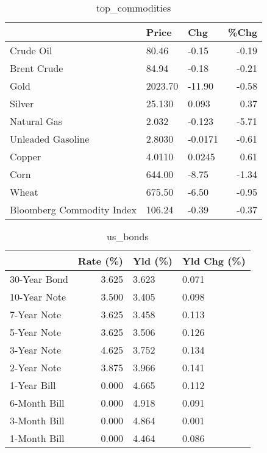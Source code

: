 \documentclass{article}%
\begin{document}
\begin{table}[htbp]%
\caption{top\_commodities}%
\centering%
\begin{adjustbox}{width=1\textwidth}%
\begin{tabular}{lllr}
\toprule
                          &   Price &     Chg &  \%Chg \\
\midrule
               Crude Oil  &   80.46 &   -0.15 & -0.19 \\
             Brent Crude  &   84.94 &   -0.18 & -0.21 \\
                    Gold  & 2023.70 &  -11.90 & -0.58 \\
                  Silver  &  25.130 &   0.093 &  0.37 \\
             Natural Gas  &   2.032 &  -0.123 & -5.71 \\
       Unleaded Gasoline  &  2.8030 & -0.0171 & -0.61 \\
                  Copper  &  4.0110 &  0.0245 &  0.61 \\
                    Corn  &  644.00 &   -8.75 & -1.34 \\
                   Wheat  &  675.50 &   -6.50 & -0.95 \\
Bloomberg Commodity Index &  106.24 &   -0.39 & -0.37 \\
\bottomrule
\end{tabular}
%
\end{adjustbox}%
\end{table}

%


\begin{table}[htbp]%
\caption{us\_bonds}%
\centering%
\begin{adjustbox}{width=1\textwidth}%
\begin{tabular}{lrll}
\toprule
             &  Rate (\%) & Yld (\%) & Yld Chg (\%) \\
\midrule
30-Year Bond &     3.625 &   3.623 &       0.071 \\
10-Year Note &     3.500 &   3.405 &       0.098 \\
 7-Year Note &     3.625 &   3.458 &       0.113 \\
 5-Year Note &     3.625 &   3.506 &       0.126 \\
 3-Year Note &     4.625 &   3.752 &       0.134 \\
 2-Year Note &     3.875 &   3.966 &       0.141 \\
 1-Year Bill &     0.000 &   4.665 &       0.112 \\
6-Month Bill &     0.000 &   4.918 &       0.091 \\
3-Month Bill &     0.000 &   4.864 &       0.001 \\
1-Month Bill &     0.000 &   4.464 &       0.086 \\
\bottomrule
\end{tabular}
%
\end{adjustbox}%
\end{table}
\end{document}
